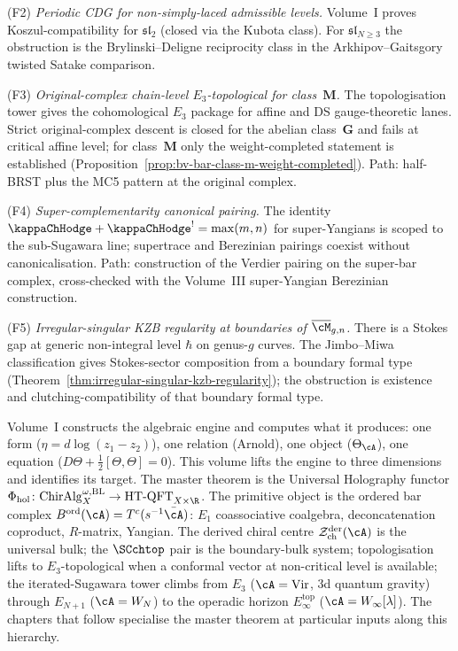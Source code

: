 (F2) \emph{Periodic CDG for non-simply-laced admissible levels.}
Volume~I proves Koszul-compatibility for $\mathfrak{sl}_2$ (closed
via the Kubota class). For $\mathfrak{sl}_{N \ge 3}$ the obstruction
is the Brylinski--Deligne reciprocity class in the Arkhipov--Gaitsgory
twisted Satake comparison.

(F3) \emph{Original-complex chain-level $E_3$-topological for
class~$\mathbf{M}$.} The topologisation tower gives the
cohomological $E_3$ package for affine and DS gauge-theoretic
lanes. Strict original-complex descent is closed for the abelian
class~$\mathbf{G}$ and fails at critical affine level; for
class~$\mathbf{M}$ only the weight-completed statement is
established
(Proposition~\ref{prop:bv-bar-class-m-weight-completed}). Path:
half-BRST plus the MC5 pattern at the original complex.

(F4) \emph{Super-complementarity canonical pairing.} The identity
$\kappaChHodge + \kappaChHodge^! = \max(m, n)$ for
super-Yangians is scoped to the sub-Sugawara line; supertrace and
Berezinian pairings coexist without canonicalisation. Path:
construction of the Verdier pairing on the super-bar complex,
cross-checked with the Volume~III
super-Yangian Berezinian construction.

(F5) \emph{Irregular-singular KZB regularity at boundaries of
$\overline{\cM}_{g,n}$.} There is a Stokes gap at generic
non-integral level $\hbar$ on genus-$g$ curves. The
Jimbo--Miwa classification gives Stokes-sector composition from a
boundary formal type
(Theorem~\ref{thm:irregular-singular-kzb-regularity}); the
obstruction is existence and clutching-compatibility of that boundary
formal type.

\bigskip

\noindent
Volume~I constructs the algebraic engine and computes what it
produces: one form ($\eta = d\log(z_1 - z_2)$), one relation
(Arnold), one object ($\Theta_\cA$), one equation
($D\Theta + \tfrac{1}{2}[\Theta, \Theta] = 0$). This volume
lifts the engine to three dimensions and identifies its target.
The master theorem is the Universal Holography functor
$\Phi_{\mathrm{hol}}\colon
\mathrm{ChirAlg}^{\omega,\mathrm{BL}}_X \to
\mathrm{HT\text{-}QFT}_{X \times \R}$. The primitive object is
the ordered bar complex
$B^{\mathrm{ord}}(\cA) = T^c(s^{-1}\bar\cA)$: $E_1$ coassociative
coalgebra, deconcatenation coproduct, $R$-matrix, Yangian. The
derived chiral centre $\cZ^{\mathrm{der}}_{\mathrm{ch}}(\cA)$ is
the universal bulk; the $\SCchtop$ pair is the boundary-bulk
system; topologisation lifts to $E_3$-topological when a
conformal vector at non-critical level is available; the
iterated-Sugawara tower climbs from $E_3$ ($\cA = \mathrm{Vir}$,
3d quantum gravity) through $E_{N+1}$ ($\cA = W_N$) to the
operadic horizon $E_\infty^{\mathrm{top}}$
($\cA = W_\infty[\lambda]$). The chapters that follow specialise
the master theorem at particular inputs along this hierarchy.

